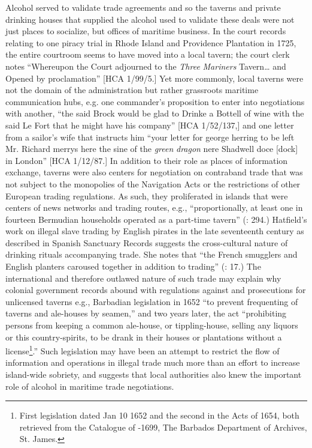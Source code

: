 Alcohol served to validate trade agreements and so the taverns and private drinking houses that supplied the alcohol used to validate these deals were not just places to socialize, but offices of maritime business. In the court records relating to one piracy trial in Rhode Island and Providence Plantation in 1725, the entire courtroom seems to have moved into a local tavern; the court clerk notes “Whereupon the Court adjourned to the \textit{Three} \textit{Mariners} Tavern… and Opened by proclamation” [HCA 1/99/5.] Yet more commonly, local taverns were not the domain of the administration but rather grassroots maritime communication hubs, e.g. one commander’s proposition to enter into negotiations with another, “the said Brock would be glad to Drinke a Bottell of wine with the said Le Fort that he might have his company” [HCA 1/52/137,] and  one letter from a sailor’s wife that instructs him “your letter for george herring to be left Mr. Richard merrys here the sine of the \textit{green} \textit{dragon} nere Shadwell doce [dock] in London” [HCA 1/12/87.] In addition to their role as places of information exchange, taverns were also centers for negotiation on contraband trade that was not subject to the monopolies of the Navigation Acts or the restrictions of other European trading regulations. As such, they proliferated in islands that were centers of news networks and trading routes, e.g., “proportionally, at least one in fourteen Bermudian households operated as a part-time tavern” (\citealt{Jarvis2010}: 294.) Hatfield’s work on illegal slave trading by English pirates in the late seventeenth century as described in Spanish Sanctuary Records suggests the cross-cultural nature of drinking rituals accompanying trade.  She notes that “the French smugglers and English planters caroused together in addition to trading” (\citealt{Hatfield2016}: 17.) The international and therefore outlawed nature of such trade may explain why colonial government records abound with regulations against and prosecutions for unlicensed taverns e.g., Barbadian legislation in 1652 “to prevent frequenting of taverns and ale-houses by seamen,” and two years later, the act “prohibiting persons from keeping a common ale-house, or tippling-house, selling any liquors or this country-spirits, to be drank in their houses or plantations without a license\footnote{First legislation dated Jan 10 1652 and the second in the Acts of 1654, both retrieved from the Catalogue of \citealt{Acts1642}-1699, The Barbados Department of Archives, St. James.}.” Such legislation may have been an attempt to restrict the flow of information and operations in illegal trade much more than an effort to increase island-wide sobriety, and suggests that local authorities also knew the important role of alcohol in maritime trade negotiations. 

